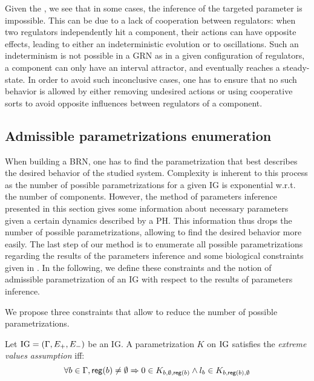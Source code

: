Given the , we see that in some cases, the inference of the targeted parameter is impossible.
This can be due to a lack of cooperation between regulators: when two regulators independently hit a component, their actions can have opposite effects, leading to either an indeterministic evolution or to oscillations.
Such an indeterminism is not possible in a GRN as in a given configuration of regulators, a component can only have an interval attractor, and eventually reaches a steady-state.
In order to avoid such inconclusive cases, one has to ensure that no such behavior is allowed by either removing undesired actions or using cooperative sorts to avoid opposite influences between regulators of a component.

\subsection{Admissible parametrizations enumeration}\label{ssec:admissible-K}

When building a BRN, one has to find the parametrization that best describes the desired behavior of the studied system.
Complexity is inherent to this process as the number of possible parametrizations for a given IG is exponential w.r.t. the number of components.
However, the method of parameters inference presented in this section gives some information about necessary parameters given a certain dynamics described by a PH.
This information thus drops the number of possible parametrizations, allowing to find the desired behavior more easily.
The last step of our method is to enumerate all possible parametrizations regarding the results of the parameters inference and some biological constraints given in \cite{BernotSemBRN}.
In the following, we define these constraints and the notion of admissible parametrization of an IG with respect to the results of parameters inference.

We propose three constraints that allow to reduce the number of possible parametrizations.

\begin{property}
Let $\mathrm{IG} = (\Gamma, E_+, E_-)$ be an IG. A parametrization $K$ on $\mathrm{IG}$ satisfies the \emph{extreme values assumption} iff:
\label{prop:param_enum_extreme}
\[
  \forall b \in \Gamma, \mathsf{reg}({b}) \neq \emptyset \Rightarrow 0 \in K_{b,\emptyset,\mathsf{reg}({b})} \wedge l_b \in K_{b,\mathsf{reg}({b}),\emptyset}
\]
\end{property}

